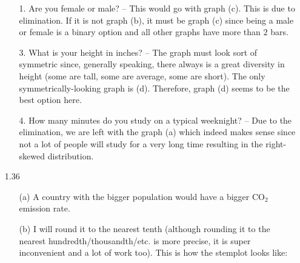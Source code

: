 \documentclass[11pt, a4paper]{article}
\begin{document}
\begin{itemize}
\begin{itemize}
\item[1.]
Are you female or male? -- This would go with graph (c). This is due to elimination.
If it is not graph (b), it must be graph (c) since being a male or female is a binary option
and all other graphs have more than $2$ bars.

\item[3.]
What is your height in inches? -- The graph must look sort of symmetric since, generally speaking,
there always is a great diversity in height (some are tall, some are average, some are short). The only
symmetrically-looking graph is (d). Therefore, graph (d) seems to be the best option here.

\item[4.]
How many minutes do you study on a typical weeknight? -- Due to the elimination, we are left with the
graph (a) which indeed makes sense since not a lot of people will study for a very long time
resulting in the right-skewed distribution.
\end{itemize}

\item[]
\item[]

\item[1.36]
\begin{itemize}
\item[(a)]
A country with the bigger population would have a bigger CO$_2$ emission rate.

\item[]

\item[(b)]
I will round it to the nearest tenth (although rounding it to the nearest hundredth/thousandth/etc. is more precise,
it is super inconvenient and a lot of work too). This is how the stemplot looks like:


\end{itemize}
\end{itemize}
\end{document}
